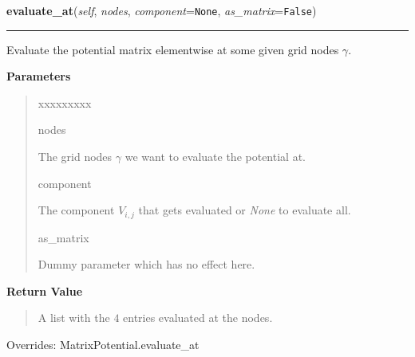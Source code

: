 \hspace{.8\funcindent}\begin{boxedminipage}{\funcwidth}

    \raggedright \textbf{evaluate\_at}(\textit{self}, \textit{nodes}, \textit{component}={\tt None}, \textit{as\_matrix}={\tt False})

    \vspace{-1.5ex}

    \rule{\textwidth}{0.5\fboxrule}
\setlength{\parskip}{2ex}
    Evaluate the potential matrix elementwise at some given grid nodes
    $\gamma$.

\setlength{\parskip}{1ex}
      \textbf{Parameters}
      \vspace{-1ex}

      \begin{quote}
        \begin{Ventry}{xxxxxxxxx}

          \item[nodes]

          The grid nodes $\gamma$ we want to evaluate the
          potential at.

          \item[component]

          The component $V_{i,j}$ that gets evaluated or \textit{None} to
          evaluate all.

          \item[as\_matrix]

          Dummy parameter which has no effect here.

        \end{Ventry}

      \end{quote}

      \textbf{Return Value}
    \vspace{-1ex}

      \begin{quote}
      A list with the $4$ entries evaluated at the nodes.

      \end{quote}



      Overrides: MatrixPotential.evaluate\_at

    \end{boxedminipage}

    \vspace{0.5ex}

